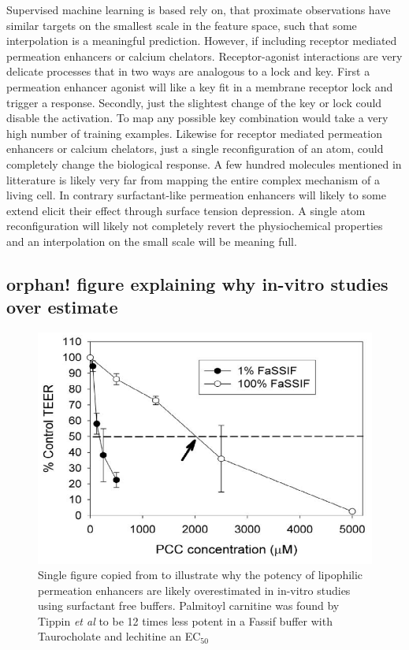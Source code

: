 Supervised machine learning is based rely on, that proximate observations have similar targets on the smallest scale in the feature space, such that some interpolation is a meaningful prediction. However, if including receptor mediated permeation enhancers or calcium chelators. Receptor-agonist interactions are very delicate processes that in two ways are analogous to a lock and key. First a permeation enhancer agonist will like a key fit in a membrane receptor lock and trigger a response. Secondly, just the slightest change of the key or lock could disable the activation. To map any possible key combination would take a very high number of training examples. Likewise for receptor mediated permeation enhancers or calcium chelators, just a single reconfiguration of an atom, could completely change the biological response. A few hundred molecules mentioned in litterature is likely very far from mapping the entire complex mechanism of a living cell. In contrary surfactant-like permeation enhancers will likely to some extend elicit their effect through surface tension depression. A single atom reconfiguration will likely not completely revert the physiochemical properties and an interpolation on the small scale will be meaning full.

\subsection{orphan! figure explaining why in-vitro studies over estimate}
\begin{figure}[!htpb]
\includegraphics[width=\textwidth,height=\textheight,keepaspectratio]{graphics/devel_Fasssif_PCC3.png}
\caption{Single figure copied from \cite{tippin2008biorelevant,nawroth2011liposome} to illustrate why the potency of lipophilic permeation enhancers are likely overestimated in in-vitro studies using surfactant free buffers. Palmitoyl carnitine was found by Tippin \textit{et al} to be 12 times less potent in a Fassif buffer with Taurocholate and lechitine an EC$_{50}$}
\label{devel_fassif}
\end{figure}



